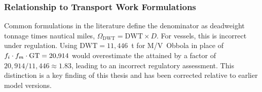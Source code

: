 \subsubsection{Relationship to Transport Work Formulations}

Common formulations in the literature define the \CII{} denominator as
deadweight tonnage times nautical miles, \ie{}
$\Omega_{\mathrm{DWT}} = \mathrm{DWT} \times D$. For \RoRo{} vessels,
this is incorrect under \IMO{} regulation. Using
$\mathrm{DWT} = 11{,}446$~t for M/V~Obbola in place of
$f_i \cdot f_m \cdot \mathrm{GT} = 20{,}914$ would overestimate the attained
\CII{} by a factor of $20{,}914 / 11{,}446 \approx 1.83$, leading to
an incorrect regulatory assessment. This distinction is a key finding
of this thesis and has been corrected relative to earlier model
versions.
